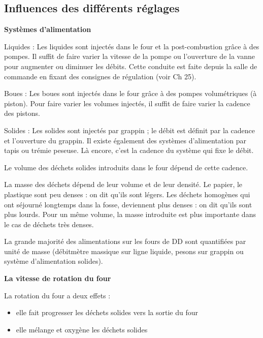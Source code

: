 \subsection{Influences des différents réglages}



\textbf{Systèmes d'alimentation}
\vspace{0.3cm}

Liquides : Les liquides sont injectés dans le four et la post-combustion grâce à des pompes. Il suffit de faire varier la vitesse de la pompe ou l’ouverture de la vanne pour augmenter ou diminuer les débits. Cette conduite est faite depuis la salle de commande en fixant des consignes de régulation (voir Ch 25).
\vspace{0.3cm}

Boues : Les boues sont injectés dans le four grâce à des pompes volumétriques (à piston). Pour faire varier les volumes injectés, il suffit de faire varier la cadence des pistons.
\vspace{0.3cm}

Solides : Les solides sont injectés par grappin ; le débit est définit par la cadence et l’ouverture du grappin. Il existe également des systèmes d’alimentation par tapis ou trémie peseuse. Là encore, c’est la cadence du système qui fixe le débit.

\vspace{0.3cm}

Le volume des déchets solides introduits dans le four dépend de cette cadence.

La masse des déchets dépend de leur volume et de leur densité. 
Le papier, le plastique sont peu denses : on dit qu’ils sont légers.
Les déchets homogènes qui ont séjourné longtemps dans la fosse, deviennent plus denses : on dit qu’ils sont plus lourds.
Pour un même volume, la masse introduite est plus importante dans le cas de déchets très denses.
\vspace{0.3cm}

La grande majorité des alimentations sur les fours de DD sont quantifiées par unité de masse (débitmètre massique sur ligne liquide, pesons sur grappin ou système d’alimentation solides).



 
 
 \vspace{0.3cm}
\textbf{La vitesse de rotation du four}
\vspace{0.3cm}

La rotation du four a deux effets :
\begin{itemize}

 \item elle fait progresser les déchets solides vers la sortie du four
 \item elle mélange et oxygène les déchets solides
   
\end{itemize}



